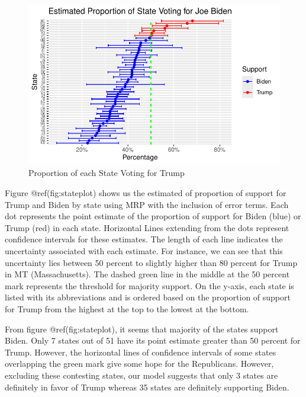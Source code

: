 \documentclass[
  letterpaper,
  DIV=11,
  numbers=noendperiod]{scrartcl}
\begin{document}
\begin{figure}

{\centering \includegraphics{paper_files/figure-pdf/stateplot-1.pdf}

}

\caption{Proportion of each State Voting for Trump}

\end{figure}

Figure @ref(fig:stateplot) shows us the estimated of proportion of
support for Trump and Biden by state using MRP with the inclusion of
error terms. Each dot represents the point estimate of the proportion of
support for Biden (blue) or Trump (red) in each state. Horizontal Lines
extending from the dots represent confidence intervals for these
estimates. The length of each line indicates the uncertainty associated
with each estimate. For instance, we can see that this uncertainty lies
between 50 percent to slightly higher than 80 percent for Trump in MT
(Massachusetts). The dashed green line in the middle at the 50 percent
mark represents the threshold for majority support. On the y-axis, each
state is listed with its abbreviations and is ordered based on the
proportion of support for Trump from the highest at the top to the
lowest at the bottom.

From figure @ref(fig:stateplot), it seems that majority of the states
support Biden. Only 7 states out of 51 have its point estimate greater
than 50 percent for Trump. However, the horizontal lines of confidence
intervals of some states overlapping the green mark give some hope for
the Republicans. However, excluding these contesting states, our model
suggests that only 3 states are definitely in favor of Trump whereas 35
states are definitely supporting Biden.
\end{document}
